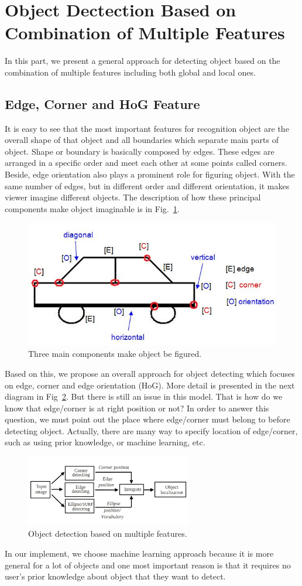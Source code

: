 \section{Object Dectection Based on Combination of Multiple Features}
\label{sec:objectdetection}
In this part, we present a general approach for detecting object based on the combination of multiple
features including both global and local ones. 
\subsection{Edge, Corner and HoG Feature}
It is easy to see that the most important features for recognition
object are the overall shape of that object and all boundaries which
separate main parts of object. Shape or boundary is basically
composed by edges. These edges are arranged in a specific order and
meet each other at some points called corners. Beside, edge
orientation also plays a prominent role for figuring object. With the
same number of edges, but in different order and different orientation,
it makes viewer imagine different objects. The description of how
these principal components make object imaginable is in Fig.~\ref{fig:3components}.
\begin{figure}[ht]
  \centering
  \includegraphics[width=2.in]{images/edge_cornre_HoG.jpg}
  \caption{Three main components make object be figured.}
  \label{fig:3components}
\end{figure}
Based on this, we propose an overall approach for object detecting
which focuses on edge, corner and edge orientation (HoG). More
detail is presented in the next diagram in Fig~\ref{fig:framework}. But there is still an
issue in this model. That is how do we know that edge/corner is at
right position or not? In order to answer this question, we must point
out the place where edge/corner must belong to before detecting
object. Actually, there are many way to specify location of
edge/corner, such as using prior knowledge, or machine learning, etc.
\begin{figure}[ht]
  \centering
  \includegraphics[width=2.85in]{images/framework1.jpg}
  \caption{Object detection based on multiple features.}
  \label{fig:framework}
\end{figure}
In our implement, we choose machine learning approach because
it is more general for a lot of objects and one most
important reason is that it requires no user's prior knowledge about object that they want to detect.

